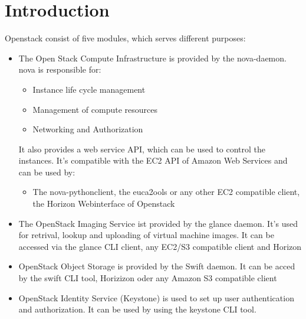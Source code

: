 \documentclass[a4paper,bibtotoc,english,liststotoc]{scrartcl}
\begin{document}
\begin{abstract}
This document describes how you use and administrate the openstack cloud
of the Distributed Systems Group at TU Braunschweig. It also describes
some basic concepts of openstack. \emph{Warning: It's not a replace of
the official documentation, use with caution!}
\end{abstract}
\tableofcontents
\section{Introduction}
\label{sec:introduction}
Openstack consist of five modules, which serves different purposes:
\begin{itemize}
\item The Open Stack Compute Infrastructure is provided by the
  nova-daemon. nova is responsible for:
  \begin{itemize}
  \item  Instance life cycle management
  \item Management of compute resources
  \item Networking and Authorization
  \end{itemize}
It also provides a web service API, which can be used to control the
instances. It's compatible with the EC2 API of Amazon Web Services and
can be used by:
\begin{itemize}
\item The nova-pythonclient, the euca2ools or any other EC2 compatible
  client, the Horizon Webinterface of Openstack
\end{itemize}
\item The OpenStack Imaging Service  ist provided by the glance
  daemon. It's used for retrival, lookup and uploading of virtual
  machine images. It can be accessed via the glance CLI client, any
  EC2/S3 compatible client and Horizon
\item OpenStack Object Storage is provided by the Swift daemon. It can
  be acced by the swift CLI tool, Horizizon oder any Amazon S3 compatible client
\item OpenStack Identity Service  (Keystone) is used to set up user
  authentication and authorization. It can be used by using the
  keystone CLI tool.
\end{itemize}
\end{document}
